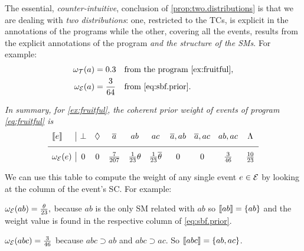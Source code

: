 \documentclass[x11names]{tlp}
\begin{document}
The essential, \emph{counter-intuitive}, conclusion of
\cref{prop:two.distributions} is that we are dealing with \emph{two
	distributions}: one, restricted to the \aclp{TC}, is explicit in the annotations of the programs while the other, covering all the events, results from the explicit annotations of the program \emph{and the structure of the
	\aclp{SM}}.
For example:
\begin{equation*}
	\begin{aligned}
		\wgtT\at{a} & = 0.3          &  &
		\text{from the program \cref{ex:fruitful}}, %
		\\
		\wgtE\at{a} & = \frac{3}{64} &  &
		\text{from \cref{eq:sbf.prior}}.
	\end{aligned}
\end{equation*}
\begin{example}
	\label{ex:prob.events}
	\em
	In summary, for \cref{ex:fruitful}, the coherent \emph{prior} weight of
	events of program \cref{eq:fruitful} is
	\begin{equation}
		\begin{array}{l|ccccccccc}
			\stablecore{e}          &
			\inconsistent           &
			\indepclass             &
			\co{a}                  &
			ab                      &
			ac                      &
			\co{a}, ab              &
			\co{a}, ac              &
			ab, ac                  &
			\consequenceclass
			\\ \hline
			\wgtE\at{e}              &
			0                       &
			0                       &
			\frac{7}{207}           &
			\frac{1}{23}\theta      &
			\frac{1}{23}\co{\theta} &
			0                       &
			0                       &
			\frac{3}{46}            &
			\frac{10}{23}
		\end{array}
		\label{eq:sbf.prior}
	\end{equation}

	We can use this table to compute the weight of any single event $e \in
		\EVENTSset$ by looking at the column of the event's \acl{SC}.
For example:
	\begin{description}
		\item $\wgtE\at{ab} = \frac{\theta}{23}, $ because $ab$ is the only \ac{SM} related with $ab$ so $\left\llbracket ab \right\rrbracket = \set{ab}$ and the weight value is found in the respective column of \cref{eq:sbf.prior}.

		\item $\wgtE\at{abc} = \frac{3}{46}$ because $abc \supset  ab$ and $abc \supset ac$.
So $\left\llbracket abc \right\rrbracket = \set{ab, ac}$.


\end{description}
\end{example}
\end{document}
